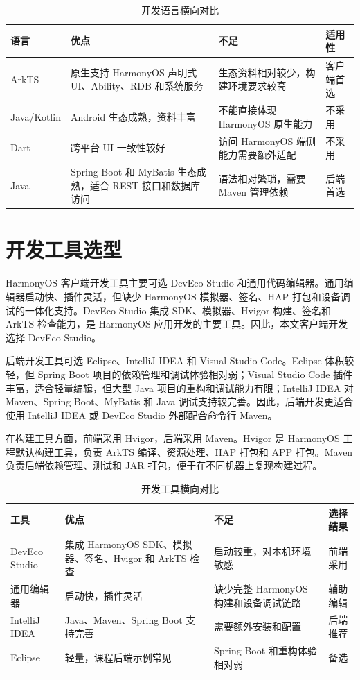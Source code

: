 \begin{table}[htbp]
\centering
\caption{开发语言横向对比}
\begin{tabularx}{\textwidth}{p{2.3cm}X X p{2.1cm}}
\toprule
语言 & 优点 & 不足 & 适用性 \\
\midrule
ArkTS & 原生支持 HarmonyOS 声明式 UI、Ability、RDB 和系统服务 & 生态资料相对较少，构建环境要求较高 & 客户端首选 \\
Java/Kotlin & Android 生态成熟，资料丰富 & 不能直接体现 HarmonyOS 原生能力 & 不采用 \\
Dart & 跨平台 UI 一致性较好 & 访问 HarmonyOS 端侧能力需要额外适配 & 不采用 \\
Java & Spring Boot 和 MyBatis 生态成熟，适合 REST 接口和数据库访问 & 语法相对繁琐，需要 Maven 管理依赖 & 后端首选 \\
\bottomrule
\end{tabularx}
\end{table}

\section{开发工具选型}

HarmonyOS 客户端开发工具主要可选 DevEco Studio 和通用代码编辑器。通用编辑器启动快、插件灵活，但缺少 HarmonyOS 模拟器、签名、HAP 打包和设备调试的一体化支持。DevEco Studio 集成 SDK、模拟器、Hvigor 构建、签名和 ArkTS 检查能力，是 HarmonyOS 应用开发的主要工具。因此，本文客户端开发选择 DevEco Studio。

后端开发工具可选 Eclipse、IntelliJ IDEA 和 Visual Studio Code。Eclipse 体积较轻，但 Spring Boot 项目的依赖管理和调试体验相对弱；Visual Studio Code 插件丰富，适合轻量编辑，但大型 Java 项目的重构和调试能力有限；IntelliJ IDEA 对 Maven、Spring Boot、MyBatis 和 Java 调试支持较完善。因此，后端开发更适合使用 IntelliJ IDEA 或 DevEco Studio 外部配合命令行 Maven。

在构建工具方面，前端采用 Hvigor，后端采用 Maven。Hvigor 是 HarmonyOS 工程默认构建工具，负责 ArkTS 编译、资源处理、HAP 打包和 APP 打包。Maven 负责后端依赖管理、测试和 JAR 打包，便于在不同机器上复现构建过程。

\begin{table}[htbp]
\centering
\caption{开发工具横向对比}
\begin{tabularx}{\textwidth}{p{2.4cm}X X p{2.1cm}}
\toprule
工具 & 优点 & 不足 & 选择结果 \\
\midrule
DevEco Studio & 集成 HarmonyOS SDK、模拟器、签名、Hvigor 和 ArkTS 检查 & 启动较重，对本机环境敏感 & 前端采用 \\
通用编辑器 & 启动快，插件灵活 & 缺少完整 HarmonyOS 构建和设备调试链路 & 辅助编辑 \\
IntelliJ IDEA & Java、Maven、Spring Boot 支持完善 & 需要额外安装和配置 & 后端推荐 \\
Eclipse & 轻量，课程后端示例常见 & Spring Boot 和重构体验相对弱 & 备选 \\
\bottomrule
\end{tabularx}
\end{table}

